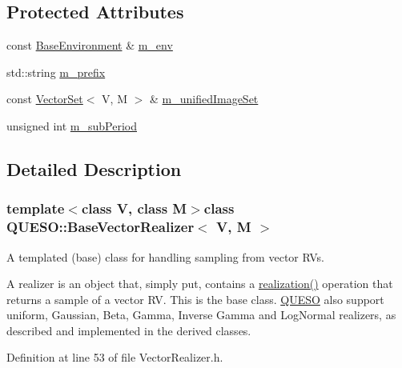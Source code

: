 \subsection*{Protected Attributes}
\begin{DoxyCompactItemize}
\item 
const \hyperlink{class_q_u_e_s_o_1_1_base_environment}{Base\-Environment} \& \hyperlink{class_q_u_e_s_o_1_1_base_vector_realizer_acde246c52f82d8ed687d91cfac14c29c}{m\-\_\-env}
\item 
std\-::string \hyperlink{class_q_u_e_s_o_1_1_base_vector_realizer_ac5559b6921816ccaed7afc2d342c2a32}{m\-\_\-prefix}
\item 
const \hyperlink{class_q_u_e_s_o_1_1_vector_set}{Vector\-Set}$<$ V, M $>$ \& \hyperlink{class_q_u_e_s_o_1_1_base_vector_realizer_a6c705235d28a3c12641da57cde948872}{m\-\_\-unified\-Image\-Set}
\item 
unsigned int \hyperlink{class_q_u_e_s_o_1_1_base_vector_realizer_aeddb6129f2810fef48b4e00daa5cea7b}{m\-\_\-sub\-Period}
\end{DoxyCompactItemize}


\subsection{Detailed Description}
\subsubsection*{template$<$class V, class M$>$class Q\-U\-E\-S\-O\-::\-Base\-Vector\-Realizer$<$ V, M $>$}

A templated (base) class for handling sampling from vector R\-Vs. 

A realizer is an object that, simply put, contains a \hyperlink{class_q_u_e_s_o_1_1_base_vector_realizer_a6845173dd79a80ae11c86cde26e55817}{realization()} operation that returns a sample of a vector R\-V. This is the base class. \hyperlink{namespace_q_u_e_s_o}{Q\-U\-E\-S\-O} also support uniform, Gaussian, Beta, Gamma, Inverse Gamma and Log\-Normal realizers, as described and implemented in the derived classes. 

Definition at line 53 of file Vector\-Realizer.\-h.



